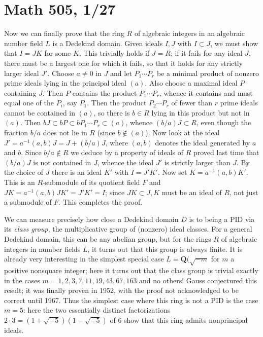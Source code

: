 \documentclass[10pt]{article}
\begin{document}
\section*{Math 505, 1/27}

Now we can finally prove that the ring $R$ of algebraic integers in an
algebraic number field $L$ is a Dedekind domain. Given ideals $I,J$ with
$I\subset J$, we must show that $I=JK$ for some $K$. This trivially
holds if $J=R$; if it fails for any ideal $J$, there must be a largest
one for which it fails, so that it holds for any strictly larger ideal
$J'$. Choose $a\ne0$ in $J$ and let $P_1\cdots P_r$ be a minimal product
of nonzero prime ideals lying in the principal ideal $(a)$. Also choose
a maximal ideal $P$ containing $J$. Then $P$ contains the product
$P_1\cdots P_r$, whence it contains and must equal one of the $P_i$, say
$P_1$. Then the product $P_2\cdots P_r$ of fewer than $r$ prime ideals
cannot be contained in $(a)$, so there is $b\in R$ lying in this product
but not in $(a)$. Then $bJ\subset bP\subset bP_1\cdots P_r\subset (a)$,
whence $(b/a)J\subset R$, even though the fraction $b/a$ does not lie in
$R$ (since $b\notin (a)$). Now look at the ideal $J' = a^{-1}(a,b)J = J
+ (b/a)J$, where $(a,b)$ denotes the ideal generated by $a$ and $b$.
Since $b/a\notin R$ we deduce by a property of ideals of $R$ proved last
time that $(b/a)J$ is not contained in $J$, whence the ideal $J'$ is
strictly larger than $J$. By the choice of $J$ there is an ideal $K'$
with $I=J'K'$. Now set $K= a^{-1}(a,b)K'$. This is an $R$-submodule of
its quotient field $F$ and $JK = a^{-1}(a,b)JK' = J'K' = I$; since
$JK\subset J, K$ must be an ideal of $R$, not just a submodule of $F$.
This completes the proof.

We can measure precisely how close a Dedekind domain $D$ is to being a
PID via its {\sl class group}, the multiplicative group of (nonzero)
ideal classes. For a general Dedekind domain, this can be any abelian
group, but for the rings $R$ of algebraic integers in number fields $L$,
it turns out that this group is always finite. It is already very
interesting in the simplest special case $L=\mathbf Q(\sqrt{-m}$ for $m$
a positive nonsquare integer; here it turns out that the class group is
trivial exactly in the cases $m = 1,2,3,7,11,19,43,67,163$ and no
others! Gauss conjectured this result; it was finally proven in 1952,
with the proof not acknowledged to be correct until 1967. Thus the
simplest case where this ring is not a PID is the case $m=5$: here the
two essentially distinct factorizations $2\cdot 3 =
(1+\sqrt{-5})(1-\sqrt{-5})$ of 6 show that this ring admits nonprincipal
ideals.
\end{document}
